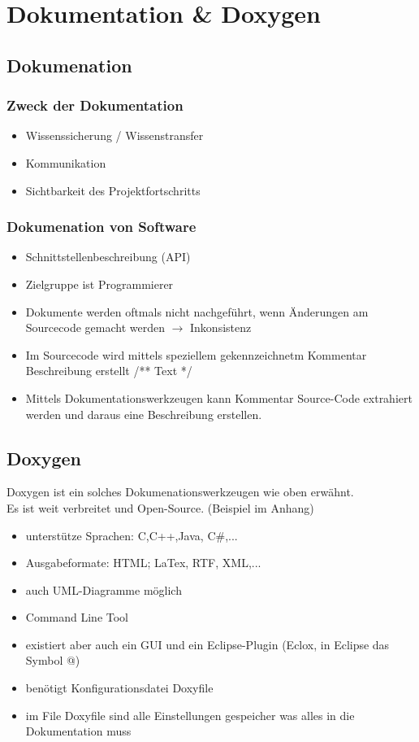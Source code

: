 \section{Dokumentation \& Doxygen}
\subsection{Dokumenation}
\subsubsection{Zweck der Dokumentation}
\begin{itemize}
	\item Wissenssicherung / Wissenstransfer
	\item Kommunikation
	\item Sichtbarkeit des Projektfortschritts
\end{itemize}
\subsubsection{Dokumenation von Software}
\begin{itemize}
	\item Schnittstellenbeschreibung (API)
	\item Zielgruppe ist Programmierer
	\item Dokumente werden oftmals nicht nachgeführt, wenn Änderungen am Sourcecode gemacht werden $\rightarrow$ Inkonsistenz
	\item Im Sourcecode wird mittels speziellem gekennzeichnetm Kommentar Beschreibung erstellt /** Text */
	\item Mittels Dokumentationswerkzeugen kann Kommentar Source-Code extrahiert werden und daraus eine Beschreibung erstellen.  
\end{itemize}
\subsection{Doxygen}
Doxygen ist ein solches Dokumenationswerkzeugen wie oben erwähnt.\\
Es ist weit verbreitet und Open-Source. (Beispiel im Anhang)
\begin{itemize}
	\item unterstütze Sprachen: C,C++,Java, C\#,...
	\item Ausgabeformate: HTML; LaTex, RTF, XML,...
	\item auch UML-Diagramme möglich
	\item Command Line Tool
	\item existiert aber auch ein GUI und ein Eclipse-Plugin (Eclox, in Eclipse das Symbol @)
	\item benötigt Konfigurationsdatei Doxyfile 
	\item im File Doxyfile sind alle Einstellungen gespeicher was alles in die Dokumentation muss
\end{itemize}

